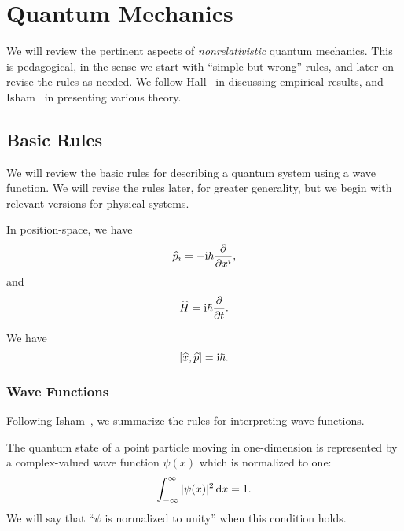 \chapter{Quantum Mechanics}

\M We will review the pertinent aspects of \emph{nonrelativistic} quantum
mechanics. This is pedagogical, in the sense we start with ``simple but wrong''
rules, and later on revise the rules as needed. We follow
Hall~\cite{Hall:2013jtz} in discussing empirical results, and
Isham~\cite{Isham:1995lq} in presenting various theory.

\section{Basic Rules}\label{sec:qm:basic-rules}

\M We will review the basic rules for describing a quantum system using
a wave function. We will revise the rules later, for greater generality,
but we begin with relevant versions for physical systems.

\M
In position-space, we have
\begin{equation}
\widehat{p}_{i} = -\mathrm{i}\hbar\frac{\partial}{\partial x^{i}},
\end{equation}
and
\begin{equation}
\widehat{H} = \mathrm{i}\hbar\frac{\partial}{\partial t}.
\end{equation}

We have
\begin{equation}\label{eq:position-momentum-uncertainty-commutator}
[\widehat{x},\widehat{p}] = \mathrm{i}\hbar.
\end{equation}


\subsection{Wave Functions}

\M Following Isham~\cite{Isham:1995lq}, we summarize the rules for
interpreting wave functions.

The quantum state of a point particle moving in one-dimension is
represented by a complex-valued wave function $\psi(x)$ which is
normalized to one:
\begin{equation}
\int^{\infty}_{-\infty}|\psi(x)|^{2}\,\mathrm{d} x = 1.
\end{equation}
We will say that ``$\psi$ is normalized to unity'' when this condition holds.

